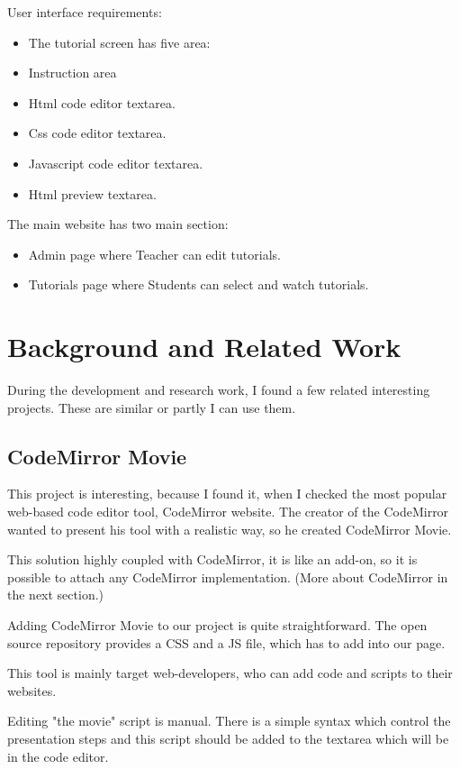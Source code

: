 \documentclass[11pt, a4paper, twoside, openright]{report}
\begin{document}
\noindent User interface requirements:
\begin{itemize}[noitemsep]
\item The tutorial screen has five area:
\item Instruction area
\item Html code editor textarea.
\item Css code editor textarea.
\item Javascript code editor textarea.
\item Html preview textarea.
\end{itemize}

\noindent The main website has two main section:
\begin{itemize}
\item Admin page where Teacher can edit tutorials.
\item Tutorials page where Students can select and watch tutorials.
\end{itemize}

\chapter{Background and Related Work}

During the development and research work, I found a few related interesting projects. These are similar or partly I can use them.

\section{CodeMirror Movie}

This project is interesting, because I found it, when I checked the most popular web-based code editor tool, CodeMirror website. The creator of the CodeMirror wanted to present his tool with a realistic way, so he created CodeMirror Movie. \cite{cm-movie}

This solution highly coupled with CodeMirror, it is like an add-on, so it is possible to attach any CodeMirror implementation. (More about CodeMirror in the next section.)

Adding CodeMirror Movie to our project is quite straightforward. The open source repository provides a CSS and a JS file, which has to add into our page.

This tool is mainly target web-developers, who can add code and scripts to their websites.

Editing "the movie" script is manual. There is a simple syntax which control the presentation steps and this script should be added to the textarea which will be in the code editor.
\end{document}
